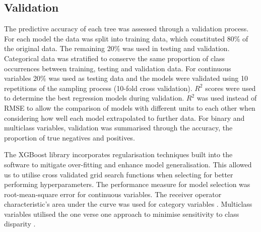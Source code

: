 \documentclass[review,12pt,authoryear]{elsarticle}
\begin{document}
\begin{linenumbers}
\subsection{Validation}

The predictive accuracy of each tree was assessed through a validation process. For each model the data was split into training data, which constituted 80\% of the original data. The remaining 20\% was used in testing and validation. Categorical data was stratified to conserve the same proportion of class occurrences between training, testing and validation data. For continuous variables 20\% was used as testing data and the models were validated using 10 repetitions of the sampling process (10-fold cross validation). $R^2$ scores were used to determine the best regression models during validation. $R^2$ was used instead of RMSE to allow the comparison of  models with different units to each other when considering how well each model extrapolated to further data. For binary and multiclass variables, validation was summarised through the accuracy, the proportion of true negatives and positives.
\par
The XGBoost library incorporates regularisation techniques built into the software to mitigate over-fitting and enhance model generalisation. This allowed us to utilise cross validated grid search functions when selecting for better performing hyperparameters. The performance measure for model selection was root-mean-square error for continuous variables. The receiver operator characteristic's area under the curve was used for category variables \citep{hanley1982meaning}. Multiclass variables utilised the one verse one approach to minimise sensitivity to class disparity \citep{ferriExperimentalComparisonPerformance2009,handSimpleGeneralisationArea2001}.




\end{linenumbers}
\end{document}
